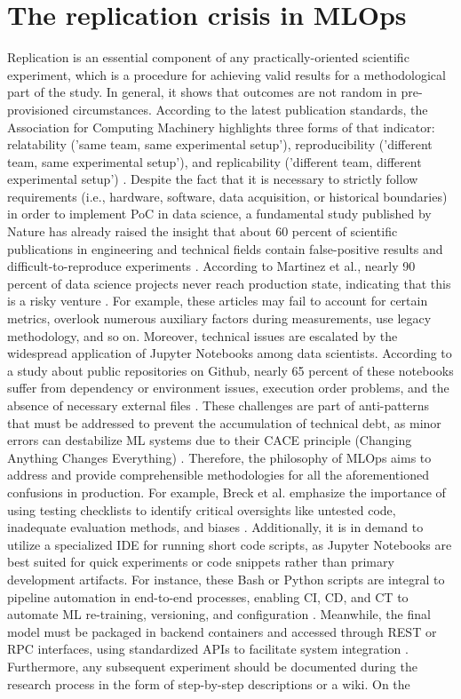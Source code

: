 \section[The replication crisis in MLOps]{The replication crisis in MLOps}
Replication is an essential component of any practically-oriented scientific experiment, which is a procedure for achieving valid results for a methodological part of the study. In general, it shows that outcomes are not random in pre-provisioned circumstances. According to the latest publication standards, the Association for Computing Machinery highlights three forms of that indicator: relatability ('same team, same experimental setup'), reproducibility ('different team, same experimental setup'), and replicability ('different team, different experimental setup') \cite{plesser_h_e_2018}. Despite the fact that it is necessary to strictly follow requirements (i.e., hardware, software, data acquisition, or historical boundaries) in order to implement PoC in data science, a fundamental study published by Nature has already raised the insight that about 60 percent of scientific publications in engineering and technical fields contain false-positive results and difficult-to-reproduce experiments \cite{baker_m_2016}. According to Martinez et al., nearly 90 percent of data science projects never reach production state, indicating that this is a risky venture \cite{martinez_i_2021}. For example, these articles may fail to account for certain metrics, overlook numerous auxiliary factors during measurements, use legacy methodology, and so on. Moreover, technical issues are escalated by the widespread application of Jupyter Notebooks among data scientists. According to a study about public repositories on Github, nearly 65 percent of these notebooks suffer from dependency or environment issues, execution order problems, and the absence of necessary external files \cite{pimentel_j_f_2019}. These challenges are part of anti-patterns that must be addressed to prevent the accumulation of technical debt, as minor errors can destabilize ML systems due to their CACE principle (Changing Anything Changes Everything) \cite{sculley_d_2015}. Therefore, the philosophy of MLOps aims to address and provide comprehensible methodologies for all the aforementioned confusions in production. For example, Breck et al. emphasize the importance of using testing checklists to identify critical oversights like untested code, inadequate evaluation methods, and biases \cite{breck_e_2017}. Additionally, it is in demand to utilize a specialized IDE for running short code scripts, as Jupyter Notebooks are best suited for quick experiments or code snippets rather than primary development artifacts. For instance, these Bash or Python scripts are integral to pipeline automation in end-to-end processes, enabling CI, CD, and CT to automate ML re-training, versioning, and configuration \cite{faubel_l_2023}. Meanwhile, the final model must be packaged in backend containers and accessed through REST or RPC interfaces, using standardized APIs to facilitate system integration \cite{kolltveir_a_b_2022}. Furthermore, any subsequent experiment should be documented during the research process in the form of step-by-step descriptions or a wiki. On the 